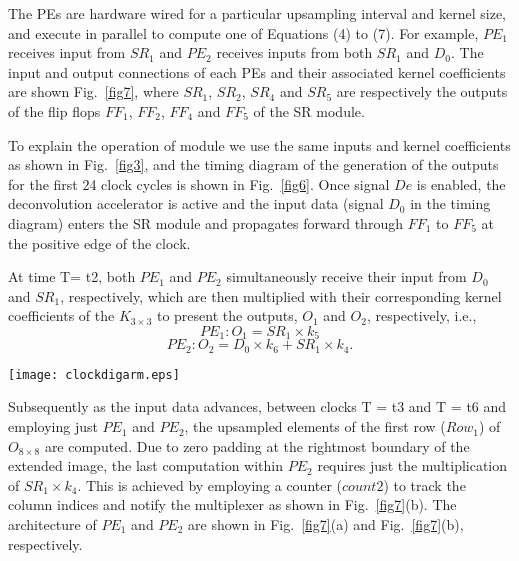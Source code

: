 \documentclass[journal]{IEEEtran}
\begin{document}
The PEs are hardware wired for a particular upsampling interval and kernel size, and execute in parallel to compute one of Equations (4) to (7). For example, $PE_1$ receives input from $SR_1$ and $PE_2$ receives inputs from both $SR_1$ and $D_0$. The input and output connections of each PEs and their associated kernel coefficients are shown Fig.~\ref{fig7}, where $SR_1$, $SR_2$, $SR_4$ and $SR_5$ are respectively the outputs of the flip flops $FF_1$, $FF_2$, $FF_4$ and $FF_5$ of the SR module.


To explain the operation of module we use the same inputs and kernel coefficients as shown in Fig.~\ref{fig3}, and the timing diagram of the generation of the outputs for the first 24 clock cycles is shown in Fig.~\ref{fig6}. Once signal $De$ is enabled, the deconvolution accelerator is active and the input data (signal $D_0$ in the timing diagram) enters the SR module and propagates forward through $FF_1$ to $FF_5$ at the positive edge of the clock. 

At time T= t2, both $PE_1$ and $PE_2$ simultaneously receive their input from $D_0$ and $SR_1$, respectively, which are then multiplied with their corresponding kernel coefficients of the $K_{3\times3}$ to present the outputs, $O_1$ and $O_2$, respectively, i.e.,
\begin{equation} PE_1:  O_1 = SR_1 \times k_5 \end{equation}	
\begin{equation}PE_2: O_2 = D_0 \times k_6 + SR_1 \times k_4. \end{equation}

\begin{figure*}[htbp]
	\centering
	\texttt{[image: clockdigarm.eps]}
	\caption{ Timing Diagram illustrating the upsampling process of  $4\times4$ to $8\times8$ for T=t0 to T=t24.}
	
	\label{fig6}
\end{figure*}


Subsequently as the input data advances, between clocks T = t3 and T = t6 and employing just $PE_1$ and $PE_2$, the upsampled elements of the first row ($Row_1$) of $O_{8 \times 8}$ are computed. Due to zero padding at the rightmost boundary of the extended image, the last computation within $PE_2$ requires just the multiplication of $SR_1 \times k_4$. This is achieved by employing a counter ($count2$) to track the column indices and notify the multiplexer as shown in Fig.~\ref{fig7}(b). The architecture of $PE_1$ and $PE_2$ are shown in Fig.~\ref{fig7}(a) and Fig.~\ref{fig7}(b), respectively.
\end{document}
